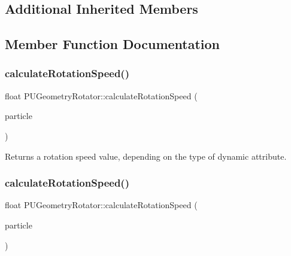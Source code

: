 \subsection*{Additional Inherited Members}


\subsection{Member Function Documentation}
\mbox{\label{classPUGeometryRotator_a4b42125d7eb3b410b67297f3b1ab824d}} 
\subsubsection{\texorpdfstring{calculate\+Rotation\+Speed()}{calculateRotationSpeed()}\hspace{0.1cm}{\footnotesize\ttfamily [1/2]}}
{\footnotesize\ttfamily float P\+U\+Geometry\+Rotator\+::calculate\+Rotation\+Speed (\begin{DoxyParamCaption}\item[{\hyperlink{structPUParticle3D}{P\+U\+Particle3D} $\ast$}]{particle }\end{DoxyParamCaption})\hspace{0.3cm}{\ttfamily [protected]}}

Returns a rotation speed value, depending on the type of dynamic attribute. \mbox{\label{classPUGeometryRotator_a4b42125d7eb3b410b67297f3b1ab824d}} 
\subsubsection{\texorpdfstring{calculate\+Rotation\+Speed()}{calculateRotationSpeed()}\hspace{0.1cm}{\footnotesize\ttfamily [2/2]}}
{\footnotesize\ttfamily float P\+U\+Geometry\+Rotator\+::calculate\+Rotation\+Speed (\begin{DoxyParamCaption}\item[{\hyperlink{structPUParticle3D}{P\+U\+Particle3D} $\ast$}]{particle }\end{DoxyParamCaption})\hspace{0.3cm}{\ttfamily [protected]}}

